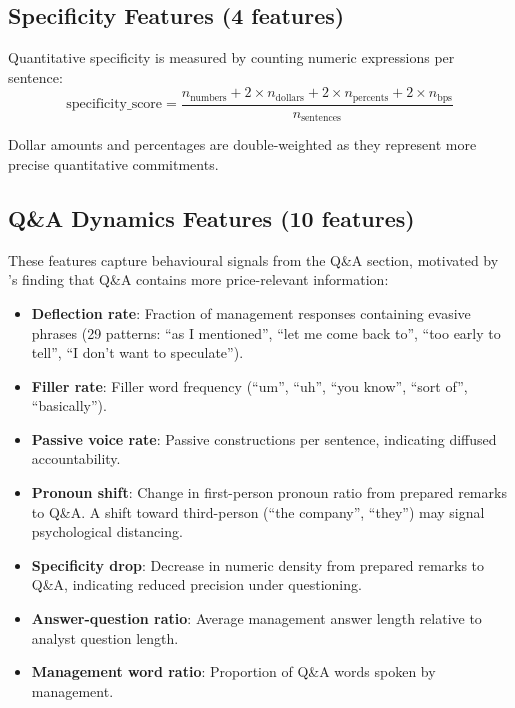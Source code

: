 \documentclass[12pt,a4paper]{article}
\begin{document}
\subsection{Specificity Features (4 features)}

Quantitative specificity is measured by counting numeric expressions per sentence:
\begin{equation}
    \text{specificity\_score} = \frac{n_{\text{numbers}} + 2 \times n_{\text{dollars}} + 2 \times n_{\text{percents}} + 2 \times n_{\text{bps}}}{n_{\text{sentences}}}
\end{equation}

Dollar amounts and percentages are double-weighted as they represent more precise quantitative commitments.

\subsection{Q\&A Dynamics Features (10 features)}

These features capture behavioural signals from the Q\&A section, motivated by \citeauthor{price2012earnings}'s finding that Q\&A contains more price-relevant information:

\begin{itemize}[noitemsep]
    \item \textbf{Deflection rate}: Fraction of management responses containing evasive phrases (29 patterns: ``as I mentioned'', ``let me come back to'', ``too early to tell'', ``I don't want to speculate'').
    \item \textbf{Filler rate}: Filler word frequency (``um'', ``uh'', ``you know'', ``sort of'', ``basically'').
    \item \textbf{Passive voice rate}: Passive constructions per sentence, indicating diffused accountability.
    \item \textbf{Pronoun shift}: Change in first-person pronoun ratio from prepared remarks to Q\&A. A shift toward third-person (``the company'', ``they'') may signal psychological distancing.
    \item \textbf{Specificity drop}: Decrease in numeric density from prepared remarks to Q\&A, indicating reduced precision under questioning.
    \item \textbf{Answer-question ratio}: Average management answer length relative to analyst question length.
    \item \textbf{Management word ratio}: Proportion of Q\&A words spoken by management.
\end{itemize}
\end{document}
